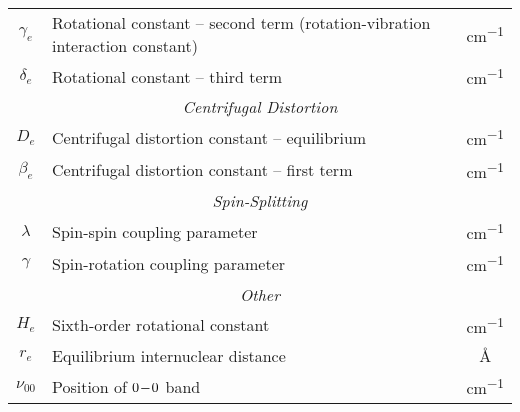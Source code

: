 \begin{table}[H]
\begin{tabular}{clc}
        $\gamma_e$      & Rotational constant -- second term (rotation-vibration interaction constant) & \unit{cm^{-1}}   \\
        $\delta_e$      & Rotational constant -- third term                                            & \unit{cm^{-1}}   \\
        \multicolumn{3}{c}{\textit{Centrifugal Distortion}}                                                                 \\
        \cmidrule(lr){1-3}
        $D_e$           & Centrifugal distortion constant -- equilibrium                               & \unit{cm^{-1}}   \\
        $\beta_e$       & Centrifugal distortion constant -- first term                                & \unit{cm^{-1}}   \\
        \multicolumn{3}{c}{\textit{Spin-Splitting}}                                                                         \\
        \cmidrule(lr){1-3}
        $\lambda$         & Spin-spin coupling parameter                                                 & \unit{cm^{-1}}   \\
        $\gamma$          & Spin-rotation coupling parameter                                             & \unit{cm^{-1}}   \\
        \multicolumn{3}{c}{\textit{Other}}                                                                                  \\
        \cmidrule(lr){1-3}
        $H_e$           & Sixth-order rotational constant                                              & \unit{cm^{-1}}   \\
        $r_e$           & Equilibrium internuclear distance                                            & \unit{\angstrom} \\
        $\nu_{00}$        & Position of $0\!-\!0$ band                                                   & \unit{cm^{-1}}   \\
        \bottomrule
    \end{tabular}
\end{table}
